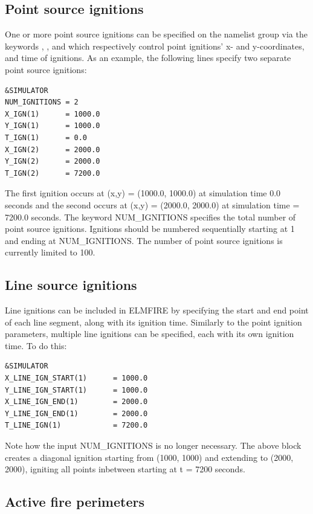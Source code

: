 \subsection{Point source ignitions}
\label{point_source_ignitions}

One or more point source ignitions can be specified on the  namelist group via the keywords , , and  which respectively control point ignitions’ x- and y-coordinates, and time of ignitions. As an example, the following lines specify two separate point source ignitions:

\begin{verbatim}
&SIMULATOR
NUM_IGNITIONS = 2
X_IGN(1)      = 1000.0
Y_IGN(1)      = 1000.0
T_IGN(1)      = 0.0
X_IGN(2)      = 2000.0
Y_IGN(2)      = 2000.0
T_IGN(2)      = 7200.0
\end{verbatim}

The first ignition occurs at (x,y) = (1000.0, 1000.0) at simulation time 0.0 seconds and the second occurs at (x,y) = (2000.0, 2000.0) at simulation time = 7200.0 seconds. The keyword NUM\_IGNITIONS specifies the total number of point source ignitions. Ignitions should be numbered sequentially starting at 1 and ending at NUM\_IGNITIONS. The number of point source ignitions is currently limited to 100.

\subsection{Line source ignitions}
\label{line_source_ignitions}

Line ignitions can be included in ELMFIRE by specifying the start and end point of each line segment, along with its ignition time. Similarly to the point ignition parameters, multiple line ignitions can be specified, each with its own ignition time. To do this:

\begin{verbatim}
&SIMULATOR
X_LINE_IGN_START(1)      = 1000.0
Y_LINE_IGN_START(1)      = 1000.0
X_LINE_IGN_END(1)        = 2000.0
Y_LINE_IGN_END(1)        = 2000.0
T_LINE_IGN(1)            = 7200.0
\end{verbatim}

Note how the input NUM\_IGNITIONS is no longer necessary. The above block creates a diagonal ignition starting from (1000, 1000) and extending to (2000, 2000), igniting all points inbetween starting at t = 7200 seconds. 

\subsection{Active fire perimeters}

